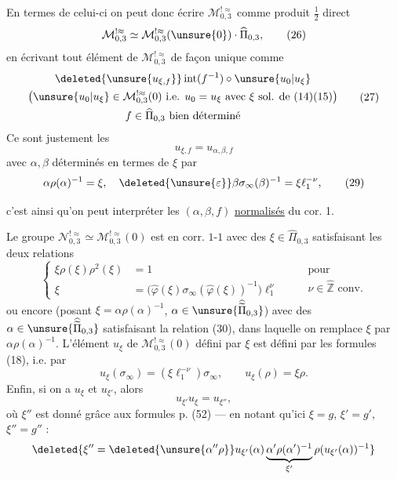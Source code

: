 En termes de celui-ci on peut donc écrire $\mathcal M_{0,3}^{!\approx}$ comme produit $\frac12$ direct
\[
\mathcal M_{0,3}^{!\approx}\simeq\mathcal M_{0,3}^{!\approx}(\unsure{0})\cdot\widehat\Pi_{0,3},
\tag{26}
\]
en écrivant tout élément de $\mathcal M_{0,3}^{!\approx}$ de façon unique comme
\[
\begin{gathered}
\deleted{\unsure{u_{\xi,f}}}\operatorname{int}(f^{-1})\circ\unsure{u_0|u_\xi}\\
\bigl(\unsure{u_0|u_\xi}\in\mathcal M_{0,3}^{!\approx}(0)\text{ i.e. }u_0=u_\xi\text{ avec }\xi\text{ sol. de }(14)(15)\bigr)\\
f\in\widehat\Pi_{0,3}\text{ bien déterminé}
\end{gathered}
\tag{27}
\]
Ce sont justement les  
\[
u_{\xi,f}=u_{\alpha,\beta,f}
\tag{28}
\]
avec $\alpha,\beta$ déterminés en termes de $\xi$ par
\[
\alpha\rho(\alpha)^{-1}=\xi,\quad\deleted{\unsure{\varepsilon}}\beta\sigma_\infty(\beta)^{-1}=\xi \ell_1^{-\nu},
\tag{29}
\]


c'est ainsi qu'on peut interpréter les  $(\alpha,\beta,f)$ \uline{normalisés} du cor. 1.

\uline{}  Le groupe $\mathcal N_{0,3}^{!\approx}\simeq\mathcal M_{0,3}^{!\approx}(0)$ est en corr. $1$-$1$ avec  des $\xi\in\widehat\Pi_{0,3}$ satisfaisant les deux relations
\[
\left\{
\begin{aligned}
\xi\rho(\xi)\rho^2(\xi)&=1\\
\xi&=\bigl(\widehat\varphi(\xi)\sigma_\infty(\widehat\varphi(\xi))^{-1}\bigr)\ell_1^\nu
\end{aligned}
\right.
\qquad\begin{gathered}\text{pour}\\\nu\in\widehat{\mathbb Z}\text{ conv.}\end{gathered}
\tag{30}
\]
ou encore (posant $\xi=\alpha\rho(\alpha)^{-1}$, $\alpha\in\unsure{\widehat{\widetilde\Pi}_{0,3}}$) avec  des $\alpha\in\unsure{\widehat{\widetilde\Pi}_{0,3}}$ satisfaisant la  relation (30), dans laquelle on remplace $\xi$ par $\alpha\rho(\alpha)^{-1}$. L'élément $u_\xi$ de $\mathcal M_{0,3}^{!\approx}(0)$ défini par $\xi$ est défini par les formules (18), i.e. par
\[
u_\xi(\sigma_\infty)=(\xi \ell_1^{-\nu})\sigma_\infty,
\qquad u_\xi(\rho)=\xi\rho.
\tag{31}
\]
Enfin, si on a $u_\xi$ et $u_{\xi'}$, alors
\[
u_{\xi'}u_\xi=u_{\xi''},
\tag{32}
\]
où $\xi''$ est donné grâce aux formules p.  (52) --- en notant qu'ici $\xi=g$, $\xi'=g'$, $\xi''=g''$ :
\[
\deleted{\xi''=\deleted{\unsure{\alpha''\rho}}u_{\xi'}(\alpha)\underbrace{\alpha'\rho(\alpha')^{-1}}_{\xi'}\rho(u_{\xi'}(\alpha))^{-1}}
\]

